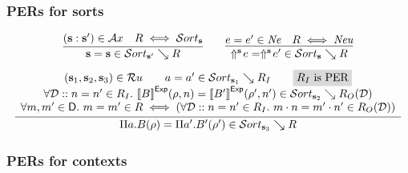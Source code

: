 \subsubsection{PERs for sorts}

\[
\begin{array}{c}
  \infer{
    \tmcst s = \tmcst s \in \persort[\tmcst s'] \searrow R
  }{
    (\tmcst s : \tmcst s') \in \Ax
    &
    R \iff \persort
  }
  \qquad
  \infer{
    \dreflect {\tmcst s} e = \dreflect {\tmcst s} {e'} \in \persort \searrow R
  }{
    e = e' \in \perne
    &
    R \iff \perneu
  }
  \\[8pt]
  \infer{
    \dpi a B \rho = \dpi {a'} {B'} {\rho'} \in \persort[\tmcst s_3] \searrow R
  }{
    \begin{array}{c}
      (\tmcst s_1, \tmcst s_2, \tmcst s_3) \in \Ru
      \qquad
      a = a' \in \persort[\tmcst s_1] \searrow R_I
      \qquad
      \mhighlight {R_I \text{ is PER}}
      \\
      \forall \DD :: n = n' \in R_I.\ \evalexpfunc B {\denvext \rho n} = \evalexpfunc {B'} {\denvext {\rho'} {n'}} \in \persort[\tmcst s_2] \searrow R_O(\DD)
      \\
      \forall m, m' \in \Dom.\ m = m' \in R \iff (\forall \DD :: n = n' \in R_I.\ \evalappfunc m n = \evalappfunc {m'} {n'} \in R_O(\DD))
    \end{array}
  }
\end{array}
\]





\subsubsection{PERs for contexts}

